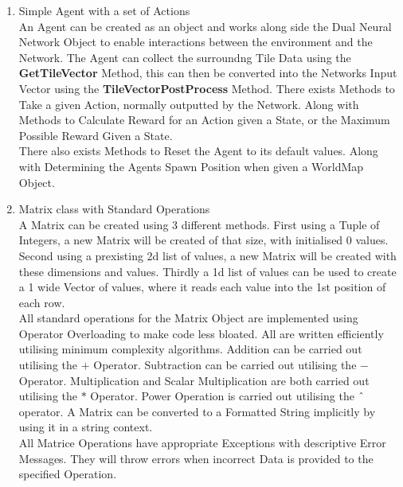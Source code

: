 \begin{flushleft}
\begin{enumerate}
\begin{enumerate}
                    \vspace{0.5cm}   
                \item Simple Agent with a set of Actions \\
                    \vspace{0.2cm}
                    An Agent can be created as an object and works along side the Dual Neural Network Object to enable interactions between the environment and
                    the Network. The Agent can collect the surroundng Tile Data using the \textbf{GetTileVector} Method, this can then be converted into the
                    Networks Input Vector using the \textbf{TileVectorPostProcess} Method. There exists Methods to Take a given Action, normally outputted by
                    the Network. Along with Methods to Calculate Reward for an Action given a State, or the Maximum Possible Reward Given a State. \\
                    \vspace{0.2cm}
                    There also exists Methods to Reset the Agent to its default values. Along with Determining the Agents Spawn Position when given a WorldMap
                    Object. \\

                    \vspace{0.5cm}   
                \item Matrix class with Standard Operations \\
                    \vspace{0.2cm}
                    A Matrix can be created using 3 different methods. First using a Tuple of Integers, a new Matrix will be created of that size, with initialised
                    0 values. Second using a prexisting 2d list of values, a new Matrix will be created with these dimensions and values. Thirdly a 1d list of
                    values can be used to create a 1 wide Vector of values, where it reads each value into the 1st position of each row. \\
                    \vspace{0.2cm}
                    All standard operations for the Matrix Object are implemented using Operator Overloading to make code less bloated. All are written 
                    efficiently utilising minimum complexity algorithms. Addition can be carried out utilising the $+$ Operator. Subtraction can be carried out
                    utilising the $-$ Operator. Multiplication and Scalar Multiplication are both carried out utilising the $*$ Operator. Power Operation is
                    carried out utilising the $\string^$ operator. A Matrix can be converted to a Formatted String implicitly by using it in a string context. \\
                    \vspace{0.2cm}
                    All Matrice Operations have appropriate Exceptions with descriptive Error Messages. They will throw errors when incorrect Data is provided to
                    the specified Operation. \\


\end{enumerate}
\end{enumerate}
\end{flushleft}
